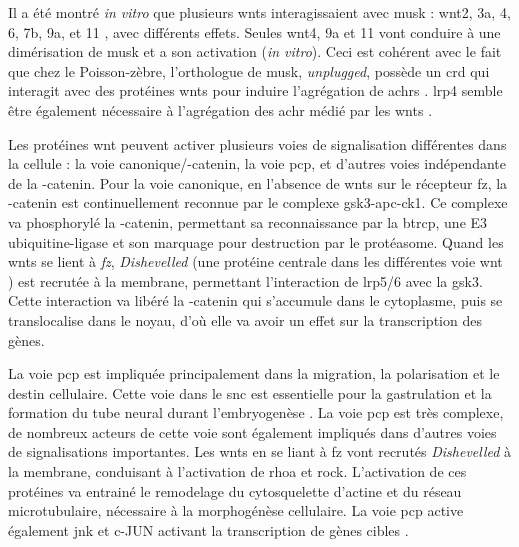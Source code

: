 Il a été montré \emph{in vitro} que plusieurs \Glspl{wnt} interagissaient avec \gls{musk} : \Gls{wnt}2, 3a, 4, 6, 7b, 9a, et 11 \cite{Strochlic2012, Zhang2012, Barik2014}, avec différents effets. Seules \gls{wnt}4, 9a et 11 vont conduire à une dimérisation de \gls{musk} et a son activation (\emph{in vitro}). Ceci est cohérent avec le fait que chez le Poisson-zèbre, l'orthologue de \gls{musk}, \emph{unplugged}, possède un \gls{crd} qui interagit avec des protéines \Glspl{wnt} pour induire l'agrégation de \glspl{achr} \cite{Jing2009, Gordon2012}. \Gls{lrp}4 semble être également nécessaire à l'agrégation des \gls{achr} médié par les \gls{wnt}s \cite{Zhang2012}.

Les protéines \gls{wnt} peuvent activer plusieurs voies de signalisation différentes dans la cellule :  la voie canonique/\textbeta{}-catenin, la voie \gls{pcp}, et d'autres voies indépendante de la \textbeta{}-catenin. Pour la voie canonique, en l'absence de \Glspl{wnt} sur le récepteur \gls{fz}, la \textbeta{}-catenin est continuellement reconnue par le complexe \acrshort{gsk3}-\acrshort{apc}-\acrshort{ck1}. Ce complexe va phosphorylé la \textbeta{}-catenin, permettant sa reconnaissance par la \gls{btrcp}, une E3 ubiquitine-ligase et son marquage pour destruction par le protéasome. Quand les \Glspl{wnt} se lient à \emph{\gls{fz}}, \emph{Dishevelled} (une protéine centrale dans les différentes voie \gls{wnt} \cite{Gao2010}) est recrutée à la membrane, permettant l'interaction de \gls{lrp}5/6 avec la \gls{gsk3}. Cette interaction va libéré la \textbeta{}-catenin qui s'accumule dans le cytoplasme, puis se translocalise dans le noyau, d'où elle va avoir un effet sur la transcription des gènes. 

La voie \gls{pcp} est impliquée principalement dans la migration, la polarisation et le destin cellulaire. Cette voie dans le \gls{snc} est essentielle pour la gastrulation et la formation du tube neural durant l'embryogenèse \cite{Adler2002, Nejsum2009}. La voie \gls{pcp} est très complexe, de nombreux acteurs de cette voie sont également impliqués dans d'autres voies de signalisations importantes. Les \Glspl{wnt} en se liant à \gls{fz} vont recrutés \emph{Dishevelled} à la membrane, conduisant à l'activation de \acrshort{rhoa} et \gls{rock}. L'activation de ces protéines va entrainé le remodelage du cytosquelette d'actine et du réseau microtubulaire, nécessaire à la morphogénèse cellulaire. La voie \gls{pcp} active également \acrshort{jnk} et c-JUN activant la transcription de gènes cibles \cite{Niehrs2012}.

